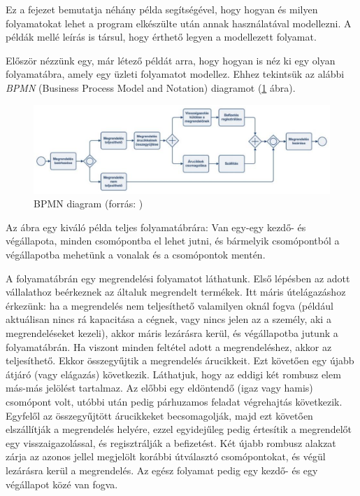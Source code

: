 

Ez a fejezet bemutatja néhány példa segítségével, hogy hogyan és milyen folyamatokat lehet a program elkészülte után annak használatával modellezni. A példák mellé leírás is társul, hogy érthető legyen a modellezett folyamat.


Először nézzünk egy, már létező példát arra, hogy hogyan is néz ki egy olyan folyamatábra, amely egy üzleti folyamatot modellez. Ehhez tekintsük az alábbi \textit{BPMN} (Business Process Model and Notation) diagramot (\ref{fig:bpmn} ábra).

\begin{figure}[h]
\centering
\includegraphics[scale=0.38]{images/BPMN.png}
\caption{BPMN diagram (forrás: \cite{bpmn})}
\label{fig:bpmn}
\end{figure}

Az ábra egy kiváló példa teljes folyamatábrára: Van egy-egy kezdő- és végállapota, minden csomópontba el lehet jutni, és bármelyik csomópontból a végállapotba mehetünk a vonalak és a csomópontok mentén.

A folyamatábrán egy megrendelési folyamatot láthatunk. Első lépésben az adott vállalathoz beérkeznek az általuk megrendelt termékek. Itt máris útelágazáshoz érkezünk: ha a megrendelés nem teljesíthető valamilyen oknál fogva (például aktuálisan nincs rá kapacitása a cégnek, vagy nincs jelen az a személy, aki a megrendeléseket kezeli), akkor máris lezárásra kerül, és végállapotba jutunk a folyamatábrán. Ha viszont minden feltétel adott a megrendeléshez, akkor az teljesíthető. Ekkor összegyűjtik a megrendelés árucikkeit. Ezt követően egy újabb átjáró (vagy elágazás) következik. Láthatjuk, hogy az eddigi két rombusz elem más-más jelölést tartalmaz. Az előbbi egy eldöntendő (igaz vagy hamis) csomópont volt, utóbbi után pedig párhuzamos feladat végrehajtás következik. Egyfelől az összegyűjtött árucikkeket becsomagolják, majd ezt követően elszállítják a megrendelés helyére, ezzel egyidejűleg pedig értesítik a megrendelőt egy visszaigazolással, és regisztrálják a befizetést. Két újabb rombusz alakzat zárja az azonos jellel megjelölt korábbi útválasztó csomópontokat, és végül lezárásra kerül a megrendelés. Az egész folyamat pedig egy kezdő- és egy végállapot közé van fogva.

